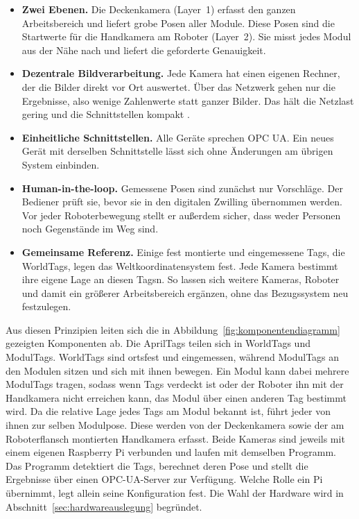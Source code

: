 \begin{itemize}
    \item \textbf{Zwei Ebenen.} Die Deckenkamera (Layer~1) erfasst den ganzen Arbeitsbereich und liefert grobe Posen aller Module. Diese Posen sind die Startwerte für die Handkamera am Roboter (Layer~2). Sie misst jedes Modul aus der Nähe nach und liefert die geforderte Genauigkeit.
    \item \textbf{Dezentrale Bildverarbeitung.} Jede Kamera hat einen eigenen Rechner, der die Bilder direkt vor Ort auswertet. Über das Netzwerk gehen nur die Ergebnisse, also wenige Zahlenwerte statt ganzer Bilder. Das hält die Netzlast gering und die Schnittstellen kompakt \cite{Shi2016}.
    \item \textbf{Einheitliche Schnittstellen.} Alle Geräte sprechen OPC UA. Ein neues Gerät mit derselben Schnittstelle lässt sich ohne Änderungen am übrigen System einbinden.
    \item \textbf{Human-in-the-loop.} Gemessene Posen sind zunächst nur Vorschläge. Der Bediener prüft sie, bevor sie in den digitalen Zwilling übernommen werden. Vor jeder Roboterbewegung stellt er außerdem sicher, dass weder Personen noch Gegenstände im Weg sind.
    \item \textbf{Gemeinsame Referenz.} Einige fest montierte und eingemessene Tags, die WorldTags, legen das Weltkoordinatensystem fest. Jede Kamera bestimmt ihre eigene Lage an diesen Tagsn. So lassen sich weitere Kameras, Roboter und damit ein größerer Arbeitsbereich ergänzen, ohne das Bezugssystem neu festzulegen.
\end{itemize}

Aus diesen Prinzipien leiten sich die in Abbildung~\ref{fig:komponentendiagramm} gezeigten Komponenten ab. Die AprilTags teilen sich in WorldTags und ModulTags. WorldTags sind ortsfest und eingemessen, während ModulTags an den Modulen sitzen und sich mit ihnen bewegen. Ein Modul kann dabei mehrere ModulTags tragen, sodass wenn Tags verdeckt ist oder der Roboter ihn mit der Handkamera nicht erreichen kann, das Modul über einen anderen Tag bestimmt wird. Da die relative Lage jedes Tags am Modul bekannt ist, führt jeder von ihnen zur selben Modulpose. Diese werden von der Deckenkamera sowie der am Roboterflansch montierten Handkamera erfasst. Beide Kameras sind jeweils mit einem eigenen Raspberry Pi verbunden und laufen mit demselben Programm. Das Programm detektiert die Tags, berechnet deren Pose und stellt die Ergebnisse über einen OPC-UA-Server zur Verfügung. Welche Rolle ein Pi übernimmt, legt allein seine Konfiguration fest. Die Wahl der Hardware wird in Abschnitt~\ref{sec:hardwareauslegung} begründet.

